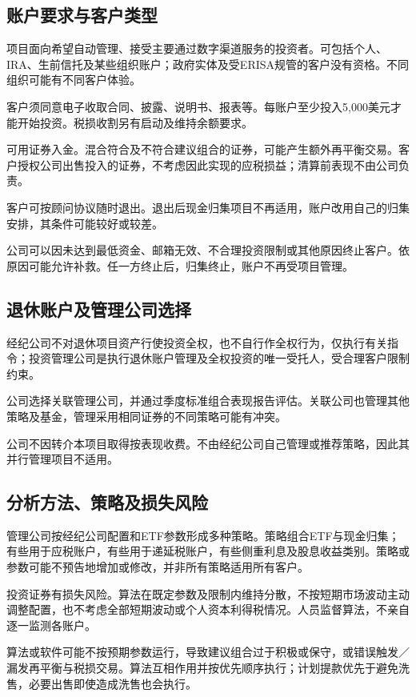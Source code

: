 \documentclass[UTF8,fontset=none,11pt,a4paper]{ctexart}
\begin{document}
\subsection*{账户要求与客户类型}
项目面向希望自动管理、接受主要通过数字渠道服务的投资者。可包括个人、IRA、生前信托及某些组织账户；政府实体及受ERISA规管的客户没有资格。不同组织可能有不同客户体验。


客户须同意电子收取合同、披露、说明书、报表等。每账户至少投入5,000美元才能开始投资。税损收割另有启动及维持余额要求。


可用证券入金。混合符合及不符合建议组合的证券，可能产生额外再平衡交易。客户授权公司出售投入的证券，不考虑因此实现的应税损益；清算前表现不由公司负责。


客户可按顾问协议随时退出。退出后现金归集项目不再适用，账户改用自己的归集安排，其条件可能较好或较差。


公司可以因未达到最低资金、邮箱无效、不合理投资限制或其他原因终止客户。依原因可能允许补救。任一方终止后，归集终止，账户不再受项目管理。


\subsection*{退休账户及管理公司选择}
经纪公司不对退休项目资产行使投资全权，也不自行作全权行为，仅执行有关指令；投资管理公司是执行退休账户管理及全权投资的唯一受托人，受合理客户限制约束。


公司选择关联管理公司，并通过季度标准组合表现报告评估。关联公司也管理其他策略及基金，管理采用相同证券的不同策略可能有冲突。


公司不因转介本项目取得按表现收费。不由经纪公司自己管理或推荐策略，因此其并行管理项目不适用。


\subsection*{分析方法、策略及损失风险}
管理公司按经纪公司配置和ETF参数形成多种策略。策略组合ETF与现金归集；有些用于应税账户，有些用于递延税账户，有些侧重利息及股息收益类别。策略或参数可能不预告地增加或修改，并非所有策略适用所有客户。


投资证券有损失风险。算法在既定参数及限制内维持分散，不按短期市场波动主动调整配置，也不考虑全部短期波动或个人资本利得税情况。人员监督算法，不亲自逐一监测各账户。


算法或软件可能不按预期参数运行，导致建议组合过于积极或保守，或错误触发／漏发再平衡与税损交易。算法互相作用并按优先顺序执行；计划提款优先于避免洗售，必要出售即使造成洗售也会执行。
\end{document}
